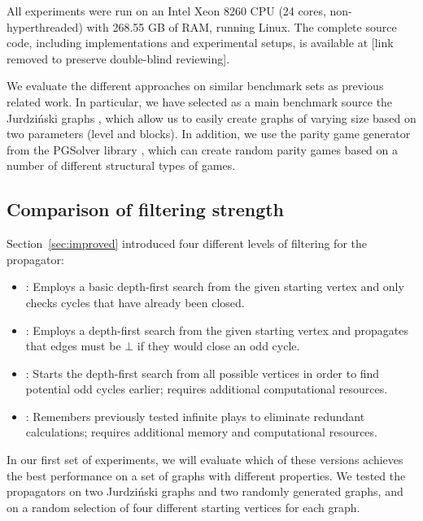 \documentclass[a4paper,UKenglish,cleveref, autoref, thm-restate, anonymous]{lipics-v2021}
\begin{document}
All experiments were run on an Intel Xeon 8260 CPU (24 cores, non-hyperthreaded) with 268.55 GB of RAM, running Linux. The complete source code, including implementations and experimental setups, is available at [link removed to preserve double-blind reviewing].

We evaluate the different approaches on similar benchmark sets as previous related work. In particular, we have selected as a main benchmark source the Jurdziński graphs \cite{Jurdziński:2022,Keiren:2015}, which allow us to easily create graphs of varying size based on two parameters (level and blocks). In addition, we use the parity game generator from the PGSolver library \cite{Friedmann:2017}, which can create random parity games based on a number of different structural types of games.

\subsection{Comparison of filtering strength}

Section~\ref{sec:improved} introduced four different levels of filtering for the \noc propagator:


\begin{itemize}
    \item \nocchecker: Employs a basic depth-first search from the given starting vertex and only checks cycles that have already been closed.
    \item \nocbasic: Employs a depth-first search from the given starting vertex and propagates that edges must be $\bot$ if they would close an odd cycle.
    \item \nocmultistart: Starts the depth-first search from all possible vertices in order to find potential odd cycles earlier; requires additional computational resources.
    \item \nocmemo: Remembers previously tested infinite plays to eliminate redundant calculations; requires additional memory and computational resources.
\end{itemize}

In our first set of experiments, we will evaluate which of these versions achieves the best performance on a set of graphs with different properties. We tested the propagators on two Jurdziński graphs and two randomly generated graphs, and on a random selection of four different starting vertices for each graph.
\end{document}
